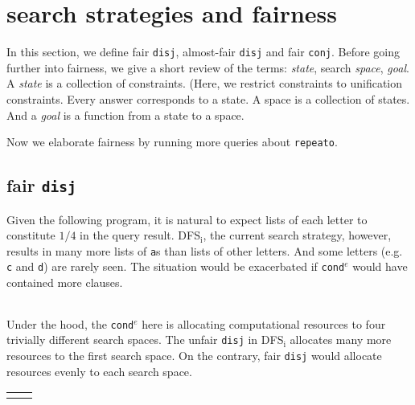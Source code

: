 \documentclass[format=acmlarge, review=true, authordraft=true]{acmart}
\newcommand{\conde}{\texttt{cond$^e$}}
\newcommand{\conj}{\texttt{conj}}
\newcommand{\disj}{\texttt{disj}}
\newcommand{\DFSi }[0]{DFS$_\textrm{i}$}
\begin{document}
\section{search strategies and fairness}

In this section, we define fair \disj{}, almost-fair \disj{} and fair \conj{}. 
Before going further into fairness, we give a short review of the terms:
\emph{state}, search \emph{space}, \emph{goal}.
A \emph{state} is a collection of constraints. (Here, we restrict 
constraints to unification constraints. Every answer corresponds to a 
state. A space is a collection of states. And a \emph{goal} is a 
function from a state to a space.


Now we elaborate fairness by running more queries about \texttt{repeato}.

\subsection{fair \texttt{disj}}

Given the following program, it is natural to expect lists of each letter to
constitute $1/4$ in the query result. \DFSi, the current search
strategy, however, results in many more lists of \texttt{a}s than lists
of other letters. And some letters  (e.g. \texttt{c} and \texttt{d}) are
rarely seen. The situation would be exacerbated if \conde{} would have
contained more clauses.

\begin{center}
	\begin{tabular}{c}
		
	\end{tabular}
\end{center}

Under the hood, the \conde{} here is allocating computational resources to 
four trivially different search spaces. The unfair \disj{} in 
\DFSi{} allocates many more resources to the first search space. On the 
contrary, fair \disj{} would allocate resources evenly to each search space. 

\begin{center}
	\begin{tabular}{l|r}
		 &
		
	\end{tabular}
\end{center}
\end{document}
